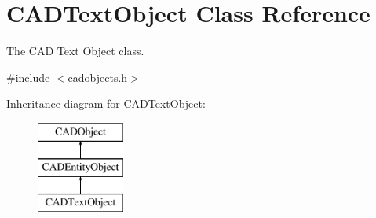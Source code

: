 \hypertarget{class_c_a_d_text_object}{}\section{C\+A\+D\+Text\+Object Class Reference}
\label{class_c_a_d_text_object}


The C\+AD Text Object class.  




{\ttfamily \#include $<$cadobjects.\+h$>$}

Inheritance diagram for C\+A\+D\+Text\+Object\+:\begin{figure}[H]
\begin{center}
\leavevmode
\includegraphics[height=3.000000cm]{class_c_a_d_text_object}
\end{center}
\end{figure}

